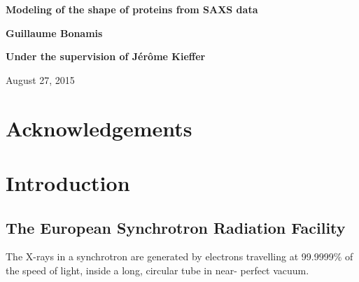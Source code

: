 \documentclass[a4paper, 11pt]{report}
\begin{document}
\begin{titlepage}
    \parindent=0pt
    \hrulefill
    \begin{center}\bfseries\Huge
        Modeling of the shape of proteins from SAXS data
    \end{center}

    \hrulefill
    \vspace*{1cm}
    \begin{center}\bfseries\Large           %
        Guillaume Bonamis
    \end{center}

    \begin{center}\bfseries\Large           %
        Under the supervision of J\'er\^ome Kieffer
    \end{center}

    \begin{flushright}
        August 27, 2015
    \end{flushright}   
    
\end{titlepage}


\tableofcontents
{}

\chapter*{Acknowledgements}



\chapter{Introduction}


\section{The European Synchrotron Radiation Facility}

The X-rays in a synchrotron are generated by electrons travelling at 
99.9999\% of the speed of light, inside a long, circular tube in near-
perfect vacuum.\\
\end{document}
